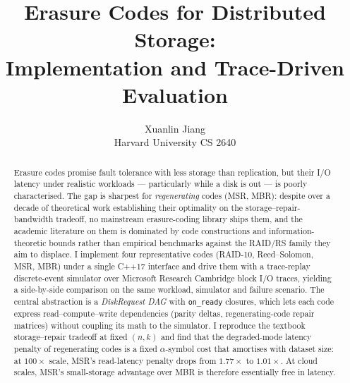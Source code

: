 \documentclass[letterpaper,twocolumn,10pt]{article}
\begin{document}

\date{}

\title{\Large \bf Erasure Codes for Distributed Storage:\\
  Implementation and Trace-Driven Evaluation}

\author{
{\rm Xuanlin Jiang}\\
Harvard University \quad CS 2640
}

\maketitle

\begin{abstract}
Erasure codes promise fault tolerance with less storage than replication, but
their I/O latency under realistic workloads --- particularly while a disk is
out --- is poorly characterised. The gap is sharpest for
\emph{regenerating} codes (MSR, MBR): despite over a decade of theoretical
work establishing their optimality on the storage--repair-bandwidth tradeoff,
no mainstream erasure-coding library ships them, and the academic literature
on them is dominated by code constructions and information-theoretic bounds
rather than empirical benchmarks against the RAID/RS family they aim to
displace. I implement four representative codes (RAID-10, Reed--Solomon,
MSR, MBR) under a single C++17 interface and drive them with a trace-replay
discrete-event simulator over Microsoft Research Cambridge block I/O traces,
yielding a side-by-side comparison on the same workload, simulator and
failure scenario. The central abstraction is a \emph{DiskRequest
DAG} with \texttt{on\_ready} closures, which lets each code express
read--compute--write dependencies (parity deltas, regenerating-code repair
matrices) without coupling its math to the simulator. I reproduce the
textbook storage--repair tradeoff at fixed $(n,k)$ and find that the
degraded-mode latency penalty of regenerating codes is a fixed
$\alpha$-symbol cost that amortises with dataset size: at $100\times$ scale,
MSR's read-latency penalty drops from $1.77\times$ to $1.01\times$. At cloud
scales, MSR's small-storage advantage over MBR is therefore essentially free
in latency.
\end{abstract}

\end{document}
